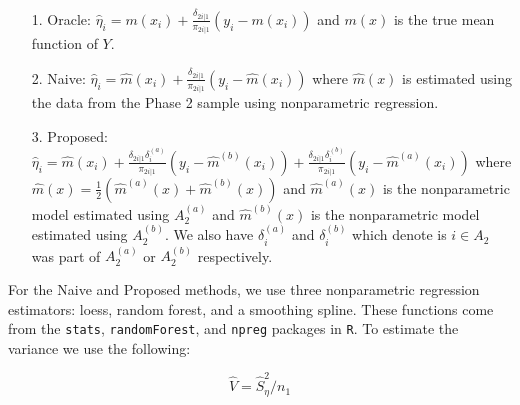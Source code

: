 \documentclass[12pt]{article}
\begin{document}
\begin{itemize}
  \item[1.] Oracle: $\hat \eta_i = m(x_i) + \frac{\delta_{2i|1}}{\pi_{2i|1}}(y_i
    - m(x_i))$ and $m(x)$ is the true mean function of $Y$.
  \item[2.] Naive: $\hat \eta_i = \hat m(x_i) + \frac{\delta_{2i|1}}{\pi_{2i|1}}(y_i
    - \hat m(x_i))$ where $\hat m(x)$ is estimated using the data from the Phase 2
    sample using nonparametric regression. 
  \item[3.] Proposed: $\hat \eta_i = \hat m(x_i) + 
    \frac{\delta_{2i|1}\delta_i^{(a)}}{\pi_{2i|1}}(y_i - \hat m^{(b)}(x_i)) +
    \frac{\delta_{2i|1}\delta_i^{(b)}}{\pi_{2i|1}}(y_i - \hat m^{(a)}(x_i))$
    where $\hat m(x) = \frac 1 2 (\hat m^{(a)}(x) + \hat m^{(b)}(x))$ and $\hat
    m^{(a)}(x)$ is the nonparametric model estimated using $A_2^{(a)}$ and $\hat
    m^{(b)}(x)$ is the nonparametric model estimated using $A_2^{(b)}$. We also
    have $\delta_i^{(a)}$ and $\delta_i^{(b)}$ which denote is $i \in A_2$ was
    part of $A_2^{(a)}$ or $A_2^{(b)}$ respectively.
\end{itemize}

For the Naive and Proposed methods, we use three nonparametric regression
estimators: loess, random forest, and a smoothing spline. These functions come
from the \texttt{stats}, \texttt{randomForest}, and \texttt{npreg} packages in
\texttt{R}. To estimate the variance we use the following:

$$\hat V = \hat S^2_\eta / n_1$$
\end{document}
